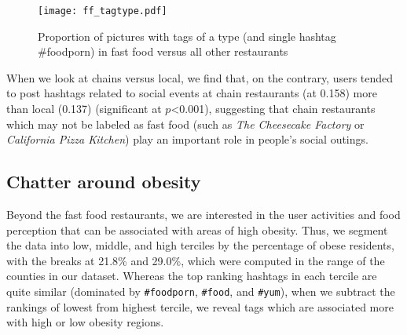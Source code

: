 \documentclass{sig-alternate-2013}
\begin{document}
\begin{figure}[t]
\begin{center}
 \texttt{[image: ff\_tagtype.pdf]}\end{center} \caption{Proportion of pictures with tags of a type (and single hashtag \#foodporn) in fast food versus all other restaurants}
\label{figure:ff_tagtype}
\end{figure}

When we look at chains versus local, we find that, on the contrary, users tended to post hashtags related to social events at chain restaurants (at 0.158) more than local (0.137) (significant at $p$<0.001), suggesting that chain restaurants which may not be labeled as fast food (such as \emph{The Cheesecake Factory} or \emph{California Pizza Kitchen}) play an important role in people's social outings. 



\subsection{Chatter around obesity}

Beyond the fast food restaurants, we are interested in the user activities and food perception that can be associated with areas of high obesity. Thus, we segment the data into low, middle, and high terciles by the percentage of obese residents, with the breaks at 21.8\% and 29.0\%, which were computed in the range of the counties in our dataset. Whereas the top ranking hashtags in each tercile are quite similar (dominated by \texttt{\#foodporn}, \texttt{\#food}, and \texttt{\#yum}), when we subtract the rankings of lowest from highest tercile, we reveal tags which are associated more with high or low obesity regions. 
\end{document}
